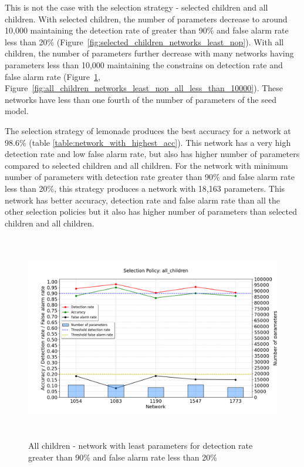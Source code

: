 This is not the case with the selection strategy - selected children and all children. With selected children, the number of parameters decrease to around 10,000 maintaining the detection rate of greater than 90\% and false alarm rate less than 20\% (Figure~\ref{fig:selected_children_networks_least_nop}). With all children, the number of parameters further decrease with many networks having parameters less than 10,000 maintaining the constrains on detection rate and false alarm rate (Figure~\ref{fig:all_children_networks_least_nop}, Figure~\ref{fig:all_children_networks_least_nop_all_less_than_10000}). These networks have less than one fourth of the number of parameters of the seed model.

The selection strategy of lemonade produces the best accuracy for a network at 98.6\% (table \ref{table:network_with_highest_acc}). This network has a very high detection rate and low false alarm rate, but also has higher number of parameters compared to selected children and all children. For the network with minimum number of parameters with detection rate greater than 90\% and false alarm rate less than 20\%, this strategy produces a network with 18,163 parameters. This network has better accuracy, detection rate and false alarm rate than all the other selection policies but it also has higher number of parameters than selected children and all children. 

\begin{figure}[ht!]
    \centering
        \includegraphics[width=1.0\linewidth, height=9cm]{BachelorMasterThesis/ExperimentsAndResults/Figures/all_children/all_children_networks_least_nop.png}
        \caption{All children - network with least parameters for detection rate greater than 90\% and false alarm rate less than 20\%}
        \label{fig:all_children_networks_least_nop}
\end{figure}

